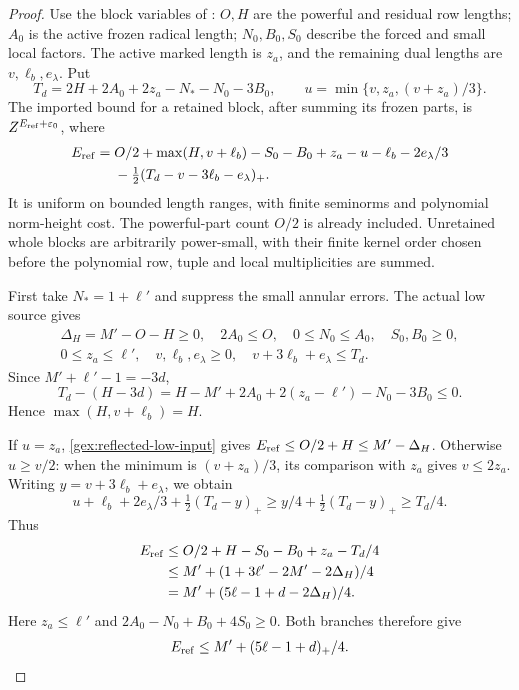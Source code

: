\begin{proof}
Use the block variables of \cite[\S14.4]{OAI26}: \(O,H\) are the
powerful and residual row lengths; \(A_0\) is the active frozen
radical length; \(N_0,B_0,S_0\) describe the forced and small local
factors.  The active marked length is \(z_a\), and the remaining
dual lengths are \(v,\ell_b,e_\lambda\).  Put
\begin{equation}
 T_d=2H+2A_0+2z_a-N_*-N_0-3B_0,\qquad
 u=\min\{v,z_a,(v+z_a)/3\}.
\label{gex:retained-low-parameters}
\end{equation}
The imported bound for a retained block, after summing its frozen
parts, is \(Z^{E_{\rm ref}+\varepsilon_0}\), where
\begin{equation}
\begin{aligned}
 E_{\rm ref}={}&O/2+\max(H,v+\ell_b)-S_0-B_0+z_a-u-\ell_b
       -2e_\lambda/3\\
 &-\tfrac12(T_d-v-3\ell_b-e_\lambda)_+.
\end{aligned}
\label{gex:reflected-low-input}
\end{equation}
It is uniform on bounded length ranges, with finite seminorms and
polynomial norm-height cost.  The powerful-part count \(O/2\) is
already included.  Unretained whole blocks are arbitrarily power-small,
with their finite kernel order chosen before the polynomial row,
tuple and local multiplicities are summed.

First take \(N_*=1+\ell'\) and suppress the small annular errors.
The actual low source gives
\begin{equation}
\begin{gathered}
 \Delta_H=M'-O-H\ge0,\quad 2A_0\le O,\quad 0\le N_0\le A_0,\quad
 S_0,B_0\ge0,\\
 0\le z_a\le\ell',\quad v,\ell_b,e_\lambda\ge0,\quad
 v+3\ell_b+e_\lambda\le T_d.
\end{gathered}
\label{gex:actual-low-constraints}
\end{equation}
Since \(M'+\ell'-1=-3d\),
\begin{equation}
 T_d-(H-3d)
 =H-M'+2A_0+2(z_a-\ell')-N_0-3B_0\le0.
\label{gex:low-row-branch}
\end{equation}
Hence \(\max(H,v+\ell_b)=H\).

If \(u=z_a\), \eqref{gex:reflected-low-input} gives
\(E_{\rm ref}\le O/2+H\le M'-\Delta_H\).
Otherwise \(u\ge v/2\): when the minimum is \((v+z_a)/3\), its
comparison with \(z_a\) gives \(v\le2z_a\).
Writing \(y=v+3\ell_b+e_\lambda\), we obtain
\[
 u+\ell_b+2e_\lambda/3+\tfrac12(T_d-y)_+
 \ge y/4+\tfrac12(T_d-y)_+\ge T_d/4.
\]
Thus
\begin{align}
 E_{\rm ref}
 &\le O/2+H-S_0-B_0+z_a-T_d/4\notag\\
 &\le M'+(1+3\ell'-2M'-2\Delta_H)/4\notag\\
 &=M'+(5\ell-1+d-2\Delta_H)/4.
\label{gex:second-low-branch}
\end{align}
Here \(z_a\le\ell'\) and \(2A_0-N_0+B_0+4S_0\ge0\).
Both branches therefore give
\begin{equation}
 E_{\rm ref}\le M'+(5\ell-1+d)_+/4.
\label{gex:generalized-low-exponent}
\end{equation}


\end{proof}
